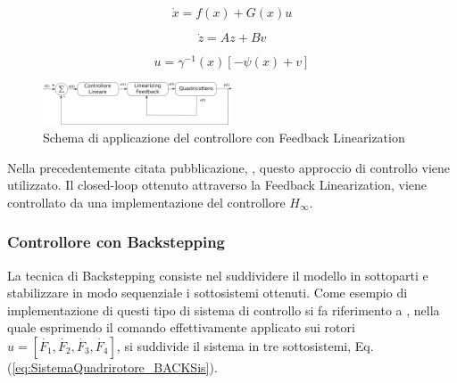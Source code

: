 \begin{equation}\label{eq:SistemaQuadrirotore_Sistemanonlin}
	\dot{x} = f(x) + G(x) u
\end{equation}

\begin{equation}\label{eq:SistemaQuadrirotore_Sistemalin}
	\dot{z} = A z + B v
\end{equation}

\begin{equation}\label{eq:SistemaQuadrirotore_FL_com}
	u = \gamma^{-1}(x) \left[- \psi(x)+v\right]
\end{equation}

\begin{figure}
	\centering
	\includegraphics[width=0.5\textwidth]{SistemaQuadrirotore/Figure/FLP}
	\caption{Schema di applicazione del controllore con Feedback Linearization}
\end{figure}

Nella precedentemente citata pubblicazione, \cite{G_inf}, questo approccio di controllo viene utilizzato. Il closed-loop ottenuto attraverso la Feedback Linearization, viene controllato da una implementazione del controllore $H_\infty$.

\subsubsection{Controllore con Backstepping}
La tecnica di Backstepping consiste nel suddividere il modello in sottoparti e stabilizzare in modo sequenziale i sottosistemi ottenuti.
Come esempio di implementazione di questi tipo di sistema di controllo si fa riferimento a \cite{Backstepping}, nella quale esprimendo il comando effettivamente applicato sui rotori $u = \left[\dot{F_1} ,\dot{F_2}, \dot{F_3},\dot{F_4} \right]$, si suddivide il sistema in tre sottosistemi, Eq. (\ref{eq:SistemaQuadrirotore_BACKSis}).

